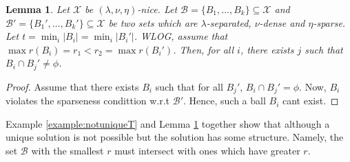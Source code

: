 \documentclass[twoside]{article}
\newcommand{\mc}{\mathcal}
\newtheorem{lemma}[theorem]{Lemma}
\begin{document}
\begin{lemma}
\label{lemma:structureT}
Let $\mc X$ be $(\lambda, \nu, \eta)$-nice. Let $\mc B = \{B_1,\ldots, B_k\} \subseteq \mc X$ and $\mc B' = \{B_1',\ldots, B_k'\} \subseteq \mc X$ be two sets which are $\lambda$-separated, $\nu$-dense and $\eta$-sparse. Let $t = \min_i |B_i| = \min_i |B_i'|$. WLOG, assume that $\max r(B_i) = r_1 < r_2 = \max r(B_i')$. Then, for all $i$, there exists $j$ such that $B_i \cap B_j' \neq \phi$.
\end{lemma} 
\begin{proof}
Assume that there exists $B_i$ such that for all $B_j'$, $B_i \cap B_j' = \phi$. Now, $B_i$ violates the sparseness condittion w.r.t $\mc B'$. Hence, such a ball $B_i$ cant exist. 
\end{proof}

Example \ref{example:notuniqueT} and Lemma \ref{lemma:structureT} together show that although a unique solution is not possible but the solution has some structure. Namely, the set $\mc B$ with the smallest $r$ must intersect with ones which have greater $r$. 
\end{document}

